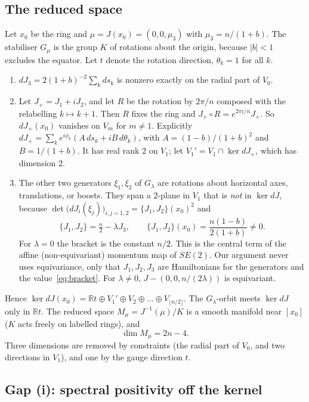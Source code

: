 \documentclass[11pt]{article}
\theoremstyle{definition}
\theoremstyle{remark}
\newcommand{\R}{\mathbb{R}}
\newcommand{\floor}[1]{\lfloor #1\rfloor}
\begin{document}
\subsection{The reduced space}

Let $x_0$ be the ring and $\mu=J(x_0)=(0,0,\mu_3)$ with $\mu_3=n/(1+b)$. The stabiliser $G_\mu$ is the group
$K$ of rotations about the origin, because $|b|<1$ excludes the equator. Let $t$ denote the rotation
direction, $\theta_k=1$ for all $k$.

\begin{enumerate}
\item[(a)] $dJ_3=2(1+b)^{-2}\sum_kds_k$ is nonzero exactly on the radial part of $V_0$.
\item[(b)] Let $J_+=J_1+iJ_2$, and let $R$ be the rotation by $2\pi/n$ composed with the relabelling
$k\mapsto k+1$. Then $R$ fixes the ring and $J_+\circ R=e^{2\pi i/n}J_+$. So $dJ_+(x_0)$ vanishes on $V_m$
for $m\ne1$. Explicitly $dJ_+=\sum_ke^{i\phi_k}(A\,ds_k+iB\,d\theta_k)$, with $A=(1-b)/(1+b)^2$ and
$B=1/(1+b)$. It has real rank $2$ on $V_1$; let $V_1'=V_1\cap\ker dJ_+$, which has dimension $2$.
\item[(c)] The other two generators $\xi_1,\xi_2$ of $G_\lambda$ are rotations about horizontal axes,
translations, or boosts. They span a $2$-plane in $V_1$ that is \emph{not} in $\ker dJ$, because
$\det\big(dJ_i(\xi_j)\big)_{i,j=1,2}=\{J_1,J_2\}(x_0)^2$ and
\begin{equation}\label{eq:bracket}
\{J_1,J_2\}=\tfrac n2-\lambda J_3,\qquad \{J_1,J_2\}(x_0)=\frac{n(1-b)}{2(1+b)}\ne0 .
\end{equation}
For $\lambda=0$ the bracket is the constant $n/2$. This is the central term of the affine (non-equivariant)
momentum map of $SE(2)$. Our argument never uses equivariance, only that $J_1,J_2,J_3$ are Hamiltonians
for the generators and the value~\eqref{eq:bracket}. For $\lambda\ne0$, $J-(0,0,n/(2\lambda))$ is equivariant.
\end{enumerate}

Hence $\ker dJ(x_0)=\R t\oplus V_1'\oplus V_2\oplus\dots\oplus V_{\floor{n/2}}$. The $G_\lambda$-orbit meets
$\ker dJ$ only in $\R t$. The reduced space $M_\mu=J^{-1}(\mu)/K$ is a smooth manifold near $[x_0]$ ($K$
acts freely on labelled rings), and
\[
\dim M_\mu=2n-4 .
\]
Three dimensions are removed by constraints (the radial part of $V_0$, and two directions in $V_1$), and one by
the gauge direction $t$.

\subsection{Gap (i): spectral positivity off the kernel}
\end{document}
